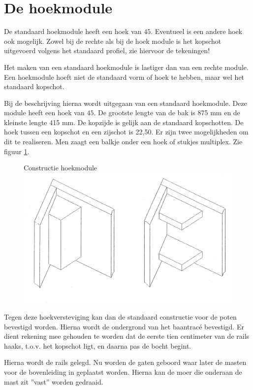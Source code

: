 \documentclass[12pt,a4paper]{report}
\newcommand*{\trace}{trac\'{e} }
\begin{document}
\section{De hoekmodule}
De standaard hoekmodule heeft een hoek van $45$\textdegree. Eventueel is een andere hoek ook mogelijk.
Zowel bij de rechte als bij de hoek module is het kopschot uitgevoerd volgens het standaard profiel, zie hiervoor de tekeningen!

Het maken van een standaard hoekmodule is lastiger dan van een rechte module. Een hoekmodule hoeft niet de standaard vorm of hoek te hebben, maar wel het standaard kopschot.

Bij de beschrijving hierna wordt uitgegaan van een standaard hoekmodule. Deze module heeft een hoek van $45$\textdegree. De grootste lengte van de bak is 875 mm en de kleinste lengte 415 mm. De kopzijde is gelijk aan de standaard kopschotten.
De hoek tussen een kopschot en een zijschot is 22,50. Er zijn twee mogelijkheden om dit te realiseren. Men zaagt een balkje onder een hoek of stukjes multiplex. Zie figuur \ref{figuur4}.

\begin{figure}[!ht]
  \captionbox
  {Constructie hoekmodule\label{figuur4}}
  {\includegraphics[scale=0.2]{images/rcu_figuur4}}
\end{figure}

Tegen deze hoekversteviging kan dan de standaard constructie voor de poten bevestigd worden. Hierna wordt de ondergrond van het baan\trace bevestigd. Er dient rekening mee gehouden te worden dat de eerste tien centimeter van de rails haaks, t.o.v. het kopschot ligt, en daarna pas de bocht begint. 

Hierna wordt de rails gelegd. Nu worden de gaten geboord waar later de masten voor de bovenleiding in geplaatst worden. 
Hierna kan de moer die onderaan de mast zit ''vast'' worden gedraaid.
\end{document}
